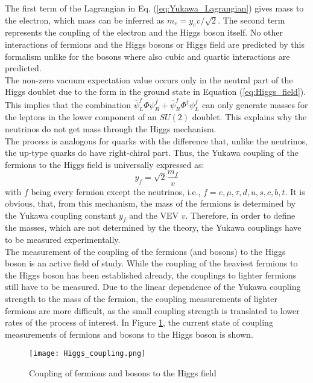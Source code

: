 The first term of the Lagrangian in Eq. (\ref{eq:Yukawa_Lagrangian}) gives mass to the electron, which mass can be inferred as $m_e = y_ev/ \sqrt{2}$. The second term represents the coupling of the electron and the Higgs boson itself. No other interactions of fermions and the Higgs bosons or Higgs field are predicted by this formalism unlike for the bosons where also cubic and quartic interactions are predicted.\\
\indent The non-zero vacuum expectation value occurs only in the neutral part of the Higgs doublet due to the form in the ground state in Equation (\ref{eq:Higgs_field}). This implies that the combination $\overline{\psi}_L^f \Phi \psi_R^f + \overline{\psi}_R^f\Phi^\dagger\psi_L^f $ can only generate masses for the leptons in the lower component of an $SU(2)$ doublet. This explains why the neutrinos do not get mass through the Higgs mechanism.\\
\indent The process is analogous for quarks with the difference that, unlike the neutrinos, the up-type quarks do have right-chiral part. Thus, the Yukawa coupling of the fermions to the Higgs field is universally expressed as:
\begin{equation}
    y_f = \sqrt{2}\frac{m_f}{v}
\end{equation}
with $f$ being every fermion except the neutrinos, i.e., $ f ={e,\mu,\tau,d,u,s,c,b,t}$. It is obvious, that, from this mechanism, the mass of the fermions is determined by the Yukawa coupling constant $y_f$ and the VEV $v$. Therefore, in order to define the masses, which are not determined by the theory, the Yukawa couplings have to be measured experimentally. \\
\indent The measurement of the coupling of the fermions (and bosons) to the Higgs boson is an active field of study. While the coupling of the heaviest fermions to the Higgs boson has been established already, the couplings to lighter fermions still have to be measured. Due to the linear dependence of the Yukawa coupling strength to the mass of the fermion, the coupling measurements of lighter fermions are more difficult, as the small coupling strength is translated to lower rates of the process of interest. In Figure \ref{fig:Higgs_coupling}, the current state of coupling measurements of fermions and bosons to the Higgs boson is shown.\\
\begin{figure}[htb!]
    \centering
    \texttt{[image: Higgs\_coupling.png]}
    \caption{Coupling of fermions and bosons to the Higgs field \cite{Higgs_2022}}
    \label{fig:Higgs_coupling}
\end{figure}

